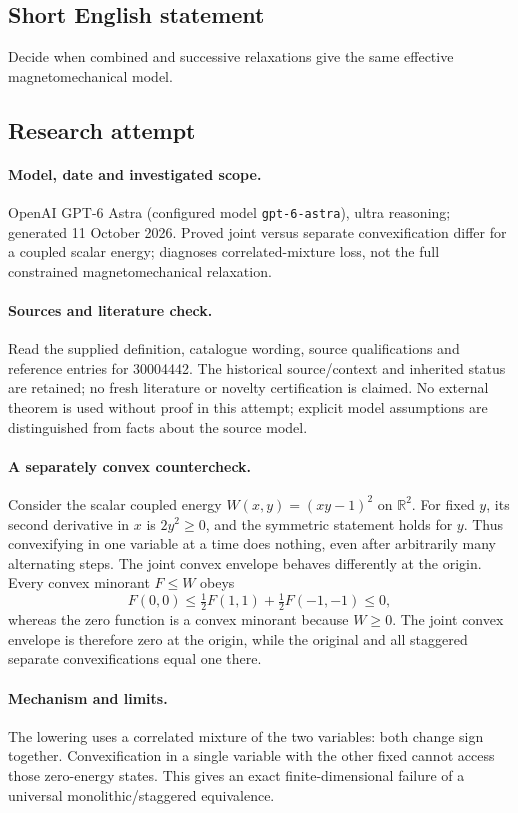 \documentclass[11pt]{article}
\begin{document}
\subsection{Short English statement}
Decide when combined and successive relaxations give the same effective magnetomechanical model.
\subsection{Research attempt}
\paragraph{Model, date and investigated scope.}
OpenAI GPT-6 Astra (configured model \texttt{gpt-6-astra}), ultra reasoning; generated 11 October 2026. Proved joint versus separate convexification differ for a coupled scalar energy; diagnoses correlated-mixture loss, not the full constrained magnetomechanical relaxation.

\paragraph{Sources and literature check.}
Read the supplied definition, catalogue wording, source qualifications and reference entries for 30004442. The historical source/context and inherited status are retained; no fresh literature or novelty certification is claimed. No external theorem is used without proof in this attempt; explicit model assumptions are distinguished from facts about the source model.

\paragraph{A separately convex countercheck.} Consider the scalar coupled energy \(W(x,y)=(xy-1)^2\) on \(\mathbb R^2\). For fixed \(y\), its second derivative in \(x\) is \(2y^2\ge0\), and the symmetric statement holds for \(y\). Thus convexifying in one variable at a time does nothing, even after arbitrarily many alternating steps.
The joint convex envelope behaves differently at the origin. Every convex minorant \(F\le W\) obeys
\[
 F(0,0)\le\tfrac12F(1,1)+\tfrac12F(-1,-1)\le0,
\]
whereas the zero function is a convex minorant because \(W\ge0\). The joint convex envelope is therefore zero at the origin, while the original and all staggered separate convexifications equal one there.
\paragraph{Mechanism and limits.} The lowering uses a correlated mixture of the two variables: both change sign together. Convexification in a single variable with the other fixed cannot access those zero-energy states. This gives an exact finite-dimensional failure of a universal monolithic/staggered equivalence.
\end{document}
